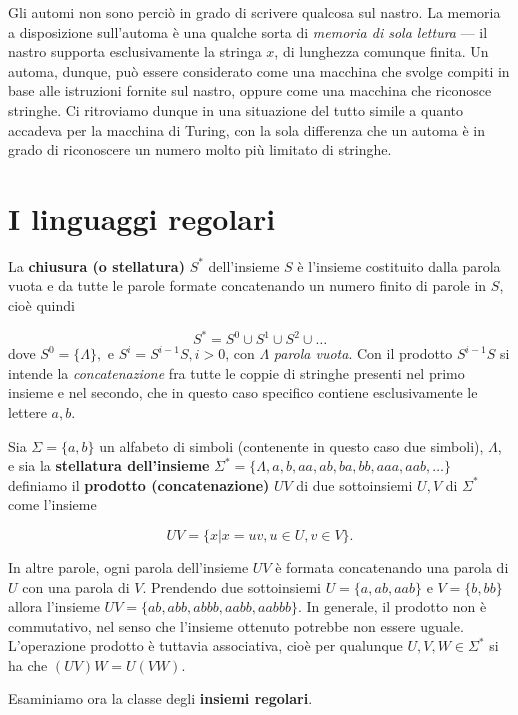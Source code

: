 \documentclass[10pt]{\classname}
\theoremstyle{definition}
\theoremstyle{definition}
\theoremstyle{definition}
\theoremstyle{definition}
\begin{document}
Gli automi non sono perciò in grado di scrivere qualcosa sul nastro. La memoria
a disposizione sull'automa è una qualche sorta di \emph{memoria di sola
lettura} --- il nastro supporta esclusivamente la stringa $x$, di lunghezza
comunque finita. Un automa, dunque, può essere considerato come una macchina
che svolge compiti in base alle istruzioni fornite sul nastro, oppure come una
macchina che riconosce stringhe. Ci ritroviamo dunque in una situazione del
tutto simile a quanto accadeva per la macchina di Turing, con la sola
differenza che un automa è in grado di riconoscere un numero molto più limitato
di stringhe.

\section{I linguaggi regolari}

La \textbf{chiusura (o stellatura)} $S^*$ dell'insieme $S$ è l'insieme
costituito dalla parola vuota e da tutte le parole formate concatenando un
numero finito di parole in $S$, cioè quindi

$$S^* = S^0 \cup S^1 \cup S^2 \cup \dots$$
dove $S^0 = \{\Lambda\},$ e $S^i=S^{i-1}S, i > 0$, con $\Lambda$ \emph{parola
vuota}. Con il prodotto $S^{i-1}S$ si intende la \emph{concatenazione} fra
tutte le coppie di stringhe presenti nel primo insieme e nel secondo, che in
questo caso specifico contiene esclusivamente le lettere $a, b$.

Sia $\Sigma = \{a, b\}$ un alfabeto di simboli (contenente in questo caso due
simboli), $\Lambda$, e sia la \textbf{stellatura
dell'insieme} $\Sigma^* = \{\Lambda, a, b, aa, ab, ba, bb, aaa, aab, \dots\}$
definiamo il \textbf{prodotto (concatenazione)} $UV$ di due sottoinsiemi $U, V$
di $\Sigma^*$ come l'insieme

$$UV = \{x | x= uv, u \in U, v \in V\}.$$

In altre parole, ogni parola dell'insieme $UV$ è formata concatenando una
parola di $U$ con una parola di $V$. Prendendo due sottoinsiemi $U=\{a, ab,
aab\}$ e $V=\{b, bb\}$ allora l'insieme $UV = \{ab, abb, abbb, aabb, aabbb\}$.
In generale, il prodotto non è commutativo, nel senso che l'insieme ottenuto
potrebbe non essere uguale. L'operazione prodotto è tuttavia associativa, cioè
per qualunque $U, V, W \in \Sigma^*$ si ha che $(UV)W = U(VW)$.

Esaminiamo ora la classe degli \textbf{insiemi regolari}. 
\end{document}
